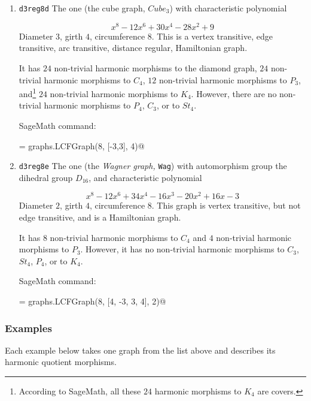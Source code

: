 \documentclass[12pt,letterpaper]{article}
\theoremstyle{definition}
\begin{document}
\begin{enumerate}
\item
  {\tt d3reg8d}\newline
The one (the cube graph, $Cube_3$) with characteristic polynomial

\[
x^8 - 12x^6 + 30x^4 - 28x^2 + 9
\]
Diameter $3$,
girth $4$,
circumference $8$.
This is a vertex transitive, edge transitive, arc transitive,
distance regular, Hamiltonian graph.

It has $24$ non-trivial harmonic morphisms to the diamond graph,
$24$ non-trivial harmonic morphisms to $C_4$,
$12$ non-trivial harmonic morphisms to $P_3$,
and\footnote{According to SageMath, all these $24$ harmonic
  morphisms to $K_4$ are covers.}
$24$ non-trivial harmonic morphisms to $K_4$.
However, there are
no non-trivial harmonic morphisms to $P_4$, $C_3$, or to $St_4$.

SageMath command:

\verb@Gamma = graphs.LCFGraph(8, [-3,3], 4)@

\item
  {\tt d3reg8e}\newline
The one (the {\it Wagner graph,} {\tt Wag})
with automorphism group the dihedral group $D_{16}$, and
characteristic polynomial

\[
x^8 - 12x^6 + 34x^4 - 16x^3 - 20x^2 + 16x - 3
\]
Diameter $2$,
girth $4$,
circumference $8$.
This graph is vertex transitive, but not edge transitive,
and is a Hamiltonian graph.

It has $8$ non-trivial harmonic morphisms to $C_4$
and $4$ non-trivial harmonic morphisms to $P_3$.
However, it has no non-trivial
harmonic morphisms to $C_3$, $St_4$, $P_4$, or to $K_4$.

SageMath command:

\verb@Gamma = graphs.LCFGraph(8, [4, -3, 3, 4], 2)@


\end{enumerate}


\subsubsection{Examples}

Each example below takes one graph from the list above and describes
its harmonic quotient morphisms.
\end{document}
